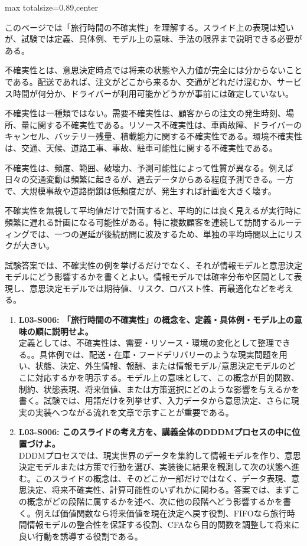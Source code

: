 \begin{minipage}[t]{0.58\textwidth}
\begin{adjustbox}{max totalsize={\textwidth}{0.89\textheight},center}
\begin{minipage}{\textwidth}\scriptsize
{}このページでは「旅行時間の不確実性」を理解する。スライド上の表現は短いが、試験では定義、具体例、モデル上の意味、手法の限界まで説明できる必要がある。\par
不確実性とは、意思決定時点では将来の状態や入力値が完全には分からないことである。配送であれば、注文がどこから来るか、交通がどれだけ混むか、サービス時間が何分か、ドライバーが利用可能かどうかが事前には確定していない。\par
不確実性は一種類ではない。需要不確実性は、顧客からの注文の発生時刻、場所、量に関する不確実性である。リソース不確実性は、車両故障、ドライバーのキャンセル、バッテリー残量、積載能力に関する不確実性である。環境不確実性は、交通、天候、道路工事、事故、駐車可能性に関する不確実性である。\par
不確実性は、頻度、範囲、破壊力、予測可能性によって性質が異なる。例えば日々の交通変動は頻繁に起きるが、過去データからある程度予測できる。一方で、大規模事故や道路閉鎖は低頻度だが、発生すれば計画を大きく壊す。\par
不確実性を無視して平均値だけで計画すると、平均的には良く見えるが実行時に頻繁に遅れる計画になる可能性がある。特に複数顧客を連続して訪問するルーティングでは、一つの遅延が後続訪問に波及するため、単独の平均時間以上にリスクが大きい。\par
試験答案では、不確実性の例を挙げるだけでなく、それが情報モデルと意思決定モデルにどう影響するかを書くとよい。情報モデルでは確率分布や区間として表現し、意思決定モデルでは期待値、リスク、ロバスト性、再最適化などを考える。\par{}\begin{enumerate}\item \textbf{L03-S006: 「旅行時間の不確実性」の概念を、定義・具体例・モデル上の意味の順に説明せよ。}\\定義としては、不確実性は、需要・リソース・環境の変化として整理できる。。具体例では、配送・在庫・フードデリバリーのような現実問題を用い、状態、決定、外生情報、報酬、または情報モデル/意思決定モデルのどこに対応するかを明示する。モデル上の意味として、この概念が目的関数、制約、状態表現、将来価値、または方策選択にどのような影響を与えるかを書く。試験では、用語だけを列挙せず、入力データから意思決定、さらに現実の実装へつながる流れを文章で示すことが重要である。\item \textbf{L03-S006: このスライドの考え方を、講義全体のDDDMプロセスの中に位置づけよ。}\\DDDMプロセスでは、現実世界のデータを集約して情報モデルを作り、意思決定モデルまたは方策で行動を選び、実装後に結果を観測して次の状態へ進む。このスライドの概念は、そのどこか一部だけではなく、データ表現、意思決定、将来不確実性、計算可能性のいずれかに関わる。答案では、まずこの概念がどの段階に属するかを述べ、次に他の段階へどう影響するかを書く。例えば価値関数なら将来価値を現在決定へ戻す役割、FIFOなら旅行時間情報モデルの整合性を保証する役割、CFAなら目的関数を調整して将来に良い行動を誘導する役割である。\end{enumerate}

\end{minipage}
\end{adjustbox}
\end{minipage}
